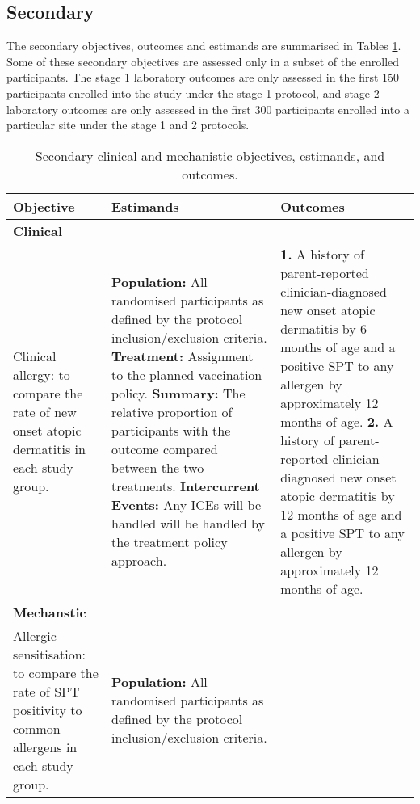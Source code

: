 \documentclass{bmcart}
\begin{document}
\subsection*{Secondary}

The secondary objectives, outcomes and estimands are summarised in Tables \ref{tab:objective-estimands-outcomes-clinical-mechanistic}.
Some of these secondary objectives are assessed only in a subset of the enrolled participants.
The stage 1 laboratory outcomes are only assessed in the first 150 participants enrolled into the study under the stage 1 protocol, and stage 2 laboratory outcomes are only assessed in the first 300 participants enrolled into a particular site under the stage 1 and 2 protocols.

\begin{table}[!ht]
	\caption{Secondary clinical and mechanistic objectives, estimands, and outcomes.}
	\label{tab:objective-estimands-outcomes-clinical-mechanistic}
	\begin{tabular}{p{4cm}p{4cm}p{4cm}}
		Objective & Estimands & Outcomes \\ \hline
		\textbf{Clinical} & & \\
		Clinical allergy: to compare the rate of new onset atopic dermatitis in each study group. &
		\textbf{Population:} All randomised participants as defined by the protocol inclusion/exclusion criteria.\newline
		\textbf{Treatment:} Assignment to the planned vaccination policy. \newline
		\textbf{Summary:} The relative proportion of participants with the outcome compared between the two treatments. \newline
		\textbf{Intercurrent Events:} Any ICEs will be handled will be handled by the treatment policy approach.  &
		\textbf{1.} A history of parent-reported clinician-diagnosed new onset atopic dermatitis by 6 months of age and a positive SPT to any allergen by approximately 12 months of age.\newline
		\textbf{2.} A history of parent-reported clinician-diagnosed new onset atopic dermatitis by 12 months of age and a positive SPT to any allergen by approximately 12 months of age.
		\\
		\textbf{Mechanstic} & & \\
		Allergic sensitisation: to compare the rate of SPT positivity to common allergens in each study group. &
		\textbf{Population:} All randomised participants as defined by the protocol inclusion/exclusion criteria.\newline

\end{tabular}
\end{table}
\end{document}
